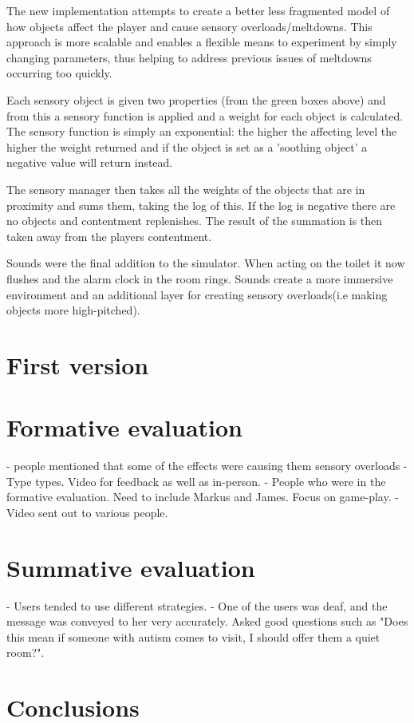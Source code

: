 \documentclass[11pt]{report}
\begin{document}
The new implementation attempts to create a better less fragmented model of how objects affect the player and cause sensory overloads/meltdowns. This approach is more scalable and enables a flexible means to experiment by simply changing parameters, thus helping to address previous issues of meltdowns occurring too quickly.

Each sensory object is given two properties (from the green boxes above) and from this a sensory function is applied and a weight for each object is calculated. The sensory function is simply an exponential: the higher the affecting level the higher the weight returned and if the object is set as a 'soothing object' a negative value will return instead. 

The sensory manager then takes all the weights of the objects that are in proximity and sums them, taking the log of this. If the log is negative there are no objects and contentment replenishes. The result of the summation is then taken away from the players contentment. 

Sounds were the final addition to the simulator. When acting on the toilet it now flushes and the alarm clock in the room rings. Sounds create a more immersive environment and an additional layer for creating sensory overloads(i.e making objects more high-pitched). 

\chapter{First version}

\chapter{Formative evaluation}
- people mentioned that some of the effects were causing them sensory overloads
- Type types. Video for feedback as well as in-person. 
- People who were in the formative evaluation. Need to include Markus and James. Focus on game-play. 
- Video sent out to various people.

\chapter{Summative evaluation}
- Users tended to use different strategies.
- One of the users was deaf, and the message was conveyed to her very accurately. Asked good questions such as "Does this mean if someone with autism comes to visit, I should offer them a quiet room?". 

\chapter{Conclusions}
\end{document}

